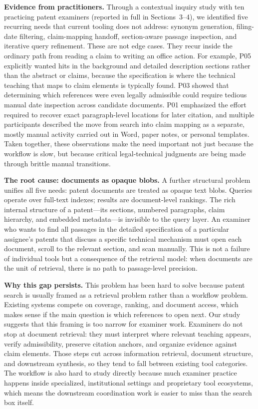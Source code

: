 \documentclass[sigconf]{acmart}
\begin{document}
\smallskip\noindent\textbf{Evidence from practitioners.}
Through a contextual inquiry study with ten practicing patent examiners (reported
in full in Sections~3--4), we identified five recurring needs that current
tooling does not address: synonym generation, filing-date filtering,
claim-mapping handoff, section-aware passage inspection, and iterative query
refinement. These are not edge cases. They recur inside the ordinary path from
reading a claim to writing an office action. For example, P05 explicitly wanted
hits in the background and detailed description sections rather than the
abstract or claims, because the specification is where the technical teaching
that maps to claim elements is typically found. P03 showed that determining
which references were even legally admissible could require tedious manual date
inspection across candidate documents. P01 emphasized the effort required to
recover exact paragraph-level locations for later citation, and multiple
participants described the move from search into claim mapping as a separate,
mostly manual activity carried out in Word, paper notes, or personal templates.
Taken together, these observations make the need important not just because the
workflow is slow, but because critical legal-technical judgments are being made
through brittle manual transitions.

\smallskip\noindent\textbf{The root cause: documents as opaque blobs.}
A further structural problem unifies all five needs: patent documents are
treated as opaque text blobs. Queries operate over full-text indexes; results
are document-level rankings. The rich internal structure of a patent---its
sections, numbered paragraphs, claim hierarchy, and embedded
metadata---is invisible to the query layer. An examiner who wants to find all
passages in the detailed specification of a particular assignee's patents that
discuss a specific technical mechanism must open each document, scroll to the
relevant section, and scan manually. This is not a failure of individual tools
but a consequence of the retrieval model: when documents are the unit of
retrieval, there is no path to passage-level precision.

\smallskip\noindent\textbf{Why this gap persists.}
This problem has been hard to solve because patent search is usually framed as a
retrieval problem rather than a workflow problem. Existing systems compete on
coverage, ranking, and document access, which makes sense if the main question
is which references to open next. Our study suggests that this framing is too
narrow for examiner work. Examiners do not stop at document retrieval: they
must interpret where relevant teaching appears, verify admissibility, preserve
citation anchors, and organize evidence against claim elements. Those steps cut
across information retrieval, document structure, and downstream synthesis, so
they tend to fall between existing tool categories. The workflow is also hard to
study directly because much examiner practice happens inside specialized,
institutional settings and proprietary tool ecosystems, which means the
downstream coordination work is easier to miss than the search box itself.
\end{document}
